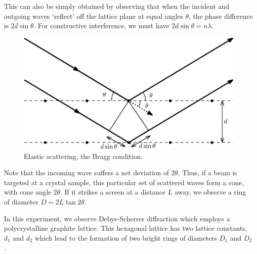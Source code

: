\documentclass[11pt]{article}
\begin{document}
        This can also be simply obtained by observing that when the incident and outgoing waves `reflect' off the lattice plane
        at equal angles $\theta$, the phase difference is $2d\sin\theta$. For constructive interference, we must have
        $2d\sin\theta = n\lambda$.

        \begin{figure}[H]
        \centering
        \includegraphics[scale=0.8]{./bragg.eps}
        \caption{Elastic scattering, the Bragg condition.}
        \label{fig:bragg}
        \end{figure}

        Note that the incoming wave suffers a net deviation of $2\theta$.
        Thus, if a beam is targeted at a crystal sample, this particular set of scattered waves form a cone, with cone angle $2\theta$.
        If it strikes a screen at a distance $L$ away, we observe a ring of diameter $D = 2L\tan{2\theta}$.

        In this experiment, we observe Debye-Scherrer diffraction which employs a polycrystalline graphite lattice. This hexagonal lattice
        has two lattice constants, $d_1$ and $d_2$ which lead to the formation of two bright rings of diameters $D_1$ and $D_2$.
        
\end{document}
